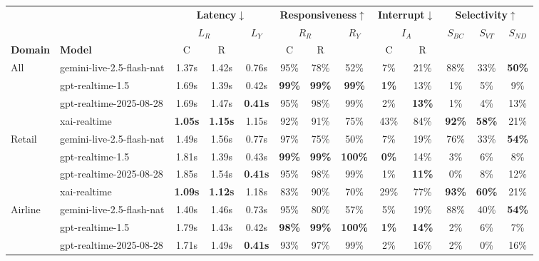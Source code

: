 \begin{tabular}{@{}ll|cc|c|cc|c|cc|ccc@{}}
\toprule
 & & \multicolumn{3}{c|}{\textbf{Latency}$\downarrow$} & \multicolumn{3}{c|}{\textbf{Responsiveness}$\uparrow$} & \multicolumn{2}{c|}{\textbf{Interrupt}$\downarrow$} & \multicolumn{3}{c}{\textbf{Selectivity}$\uparrow$} \\
 & & \multicolumn{2}{c|}{$L_R$} & \multirow{2}{*}{$L_Y$} & \multicolumn{2}{c|}{$R_R$} & \multirow{2}{*}{$R_Y$} & \multicolumn{2}{c|}{$I_A$} & \multirow{2}{*}{$S_{BC}$} & \multirow{2}{*}{$S_{VT}$} & \multirow{2}{*}{$S_{ND}$} \\
\textbf{Domain} & \textbf{Model} & C & R & & C & R & & C & R & & & \\
\midrule
\multirow{4}{*}{All} & gemini-live-2.5-flash-nat & 1.37s & 1.42s & 0.76s & 95\% & 78\% & 52\% & 7\% & 21\% & 88\% & 33\% & \textbf{50\%} \\
 & gpt-realtime-1.5 & 1.69s & 1.39s & 0.42s & \textbf{99\%} & \textbf{99\%} & \textbf{99\%} & \textbf{1\%} & 13\% & 1\% & 5\% & 9\% \\
 & gpt-realtime-2025-08-28 & 1.69s & 1.47s & \textbf{0.41s} & 95\% & 98\% & 99\% & 2\% & \textbf{13\%} & 1\% & 4\% & 13\% \\
 & xai-realtime & \textbf{1.05s} & \textbf{1.15s} & 1.15s & 92\% & 91\% & 75\% & 43\% & 84\% & \textbf{92\%} & \textbf{58\%} & 21\% \\
\midrule
\multirow{4}{*}{Retail} & gemini-live-2.5-flash-nat & 1.49s & 1.56s & 0.77s & 97\% & 75\% & 50\% & 7\% & 19\% & 76\% & 33\% & \textbf{54\%} \\
 & gpt-realtime-1.5 & 1.81s & 1.39s & 0.43s & \textbf{99\%} & \textbf{99\%} & \textbf{100\%} & \textbf{0\%} & 14\% & 3\% & 6\% & 8\% \\
 & gpt-realtime-2025-08-28 & 1.85s & 1.54s & \textbf{0.41s} & 95\% & 98\% & 99\% & 1\% & \textbf{11\%} & 0\% & 8\% & 12\% \\
 & xai-realtime & \textbf{1.09s} & \textbf{1.12s} & 1.18s & 83\% & 90\% & 70\% & 29\% & 77\% & \textbf{93\%} & \textbf{60\%} & 21\% \\
\midrule
\multirow{4}{*}{Airline} & gemini-live-2.5-flash-nat & 1.40s & 1.46s & 0.73s & 95\% & 80\% & 57\% & 5\% & 19\% & 88\% & 40\% & \textbf{54\%} \\
 & gpt-realtime-1.5 & 1.79s & 1.43s & 0.42s & \textbf{98\%} & \textbf{99\%} & \textbf{100\%} & \textbf{1\%} & \textbf{14\%} & 2\% & 6\% & 7\% \\
 & gpt-realtime-2025-08-28 & 1.71s & 1.49s & \textbf{0.41s} & 93\% & 97\% & 99\% & 2\% & 16\% & 2\% & 0\% & 16\% \\

\end{tabular}
